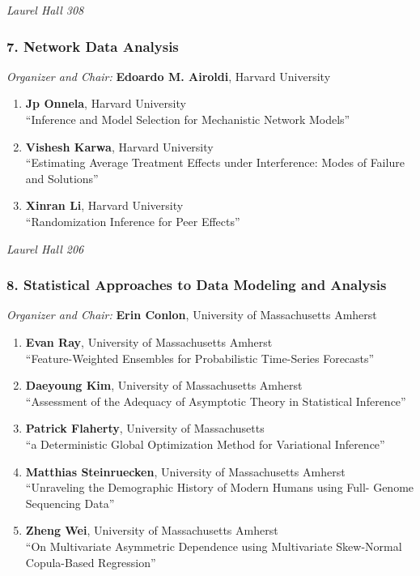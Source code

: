 \emph{Laurel Hall 308} \\[.5em]

\subsubsection*{7. Network Data Analysis}

\emph{Organizer and Chair:} \textbf{Edoardo M. Airoldi}, Harvard University

\begin{enumerate}
\item \textbf{Jp Onnela}, Harvard University \\
``Inference and Model Selection for Mechanistic Network Models''
\item \textbf{Vishesh Karwa}, Harvard University \\
``Estimating Average Treatment Effects under Interference: Modes of Failure and Solutions''
\item \textbf{Xinran Li}, Harvard University \\
``Randomization Inference for Peer Effects''
\end{enumerate}

\emph{Laurel Hall 206} \\[.5em]

\subsubsection*{8. Statistical Approaches to Data Modeling and Analysis}

\emph{Organizer and Chair:} \textbf{Erin Conlon}, University of Massachusetts Amherst

\begin{enumerate}
\item \textbf{Evan Ray}, University of Massachusetts Amherst \\
``Feature-Weighted Ensembles for Probabilistic Time-Series Forecasts''
\item \textbf{Daeyoung Kim}, University of Massachusetts Amherst \\
``Assessment of the Adequacy of Asymptotic Theory in Statistical Inference''
\item \textbf{Patrick Flaherty}, University of Massachusetts \\
``a Deterministic Global Optimization Method for Variational Inference''
\item \textbf{Matthias Steinruecken}, University of Massachusetts Amherst \\
``Unraveling the Demographic History of Modern Humans using Full- Genome Sequencing Data''
\item \textbf{Zheng Wei}, University of Massachusetts Amherst \\
``On Multivariate Asymmetric Dependence using Multivariate Skew-Normal Copula-Based Regression''
\end{enumerate}

